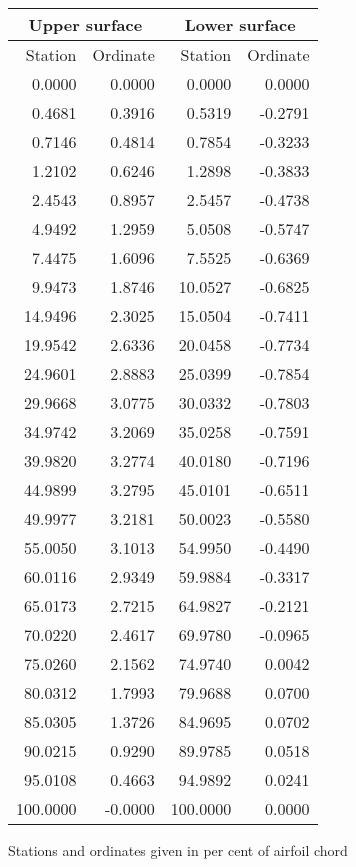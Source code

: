 \documentclass[11pt]{book}
\begin{document}
 \hspace{4mm}
 \begin{tabular}{|r|r|r|r|} \hline 
 \multicolumn{2}{|c|}{Upper surface} & \multicolumn{2}{|c|}{Lower surface} \\
 \hline
 Station & Ordinate & Station & Ordinate \\
 \hline
0.0000 & 0.0000 & 0.0000 & 0.0000 \\
0.4681 & 0.3916 & 0.5319 & -0.2791 \\
0.7146 & 0.4814 & 0.7854 & -0.3233 \\
1.2102 & 0.6246 & 1.2898 & -0.3833 \\
2.4543 & 0.8957 & 2.5457 & -0.4738 \\
4.9492 & 1.2959 & 5.0508 & -0.5747 \\
7.4475 & 1.6096 & 7.5525 & -0.6369 \\
9.9473 & 1.8746 & 10.0527 & -0.6825 \\
14.9496 & 2.3025 & 15.0504 & -0.7411 \\
19.9542 & 2.6336 & 20.0458 & -0.7734 \\
24.9601 & 2.8883 & 25.0399 & -0.7854 \\
29.9668 & 3.0775 & 30.0332 & -0.7803 \\
34.9742 & 3.2069 & 35.0258 & -0.7591 \\
39.9820 & 3.2774 & 40.0180 & -0.7196 \\
44.9899 & 3.2795 & 45.0101 & -0.6511 \\
49.9977 & 3.2181 & 50.0023 & -0.5580 \\
55.0050 & 3.1013 & 54.9950 & -0.4490 \\
60.0116 & 2.9349 & 59.9884 & -0.3317 \\
65.0173 & 2.7215 & 64.9827 & -0.2121 \\
70.0220 & 2.4617 & 69.9780 & -0.0965 \\
75.0260 & 2.1562 & 74.9740 & 0.0042 \\
80.0312 & 1.7993 & 79.9688 & 0.0700 \\
85.0305 & 1.3726 & 84.9695 & 0.0702 \\
90.0215 & 0.9290 & 89.9785 & 0.0518 \\
95.0108 & 0.4663 & 94.9892 & 0.0241 \\
100.0000 & -0.0000 & 100.0000 & 0.0000 \\
 \hline 
 \end{tabular}
 \vspace{8mm}

Stations and ordinates given in per cent of airfoil chord
\end{document}
